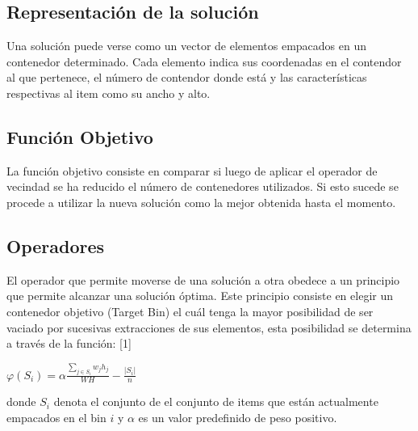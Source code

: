 \documentclass[a4paper,10pt]{article}
\begin{document}
\subsection{Representación de la solución}

Una solución puede verse como un vector de elementos empacados en un contenedor determinado. Cada elemento indica 
sus coordenadas en el contendor al que pertenece, el número de contendor donde está y las características respectivas al 
item como su ancho y alto. 

\subsection{Función Objetivo}
La función objetivo consiste en comparar si luego de aplicar el operador de vecindad se ha reducido el número de contenedores 
utilizados. Si esto sucede se procede a utilizar la nueva solución como la mejor obtenida hasta el momento.

\subsection{Operadores}
El operador que permite moverse de una solución a otra obedece a un principio que permite alcanzar una solución óptima. Este principio 
consiste en elegir un contenedor objetivo (Target Bin) el cuál tenga la mayor posibilidad de ser vaciado por sucesivas extracciones de 
sus elementos, esta posibilidad se determina a través de la función: [1]

\begin{center}
$\varphi(S_i) = \alpha \frac{\sum_{j \in S_i} {w_j h_j}}{W H} - \frac{|S_i|}{n}$
\end{center}

donde $S_i$ denota el conjunto de el conjunto de items que están actualmente empacados en el bin $i$ y $\alpha$ es un valor 
predefinido de peso positivo.
\end{document}
